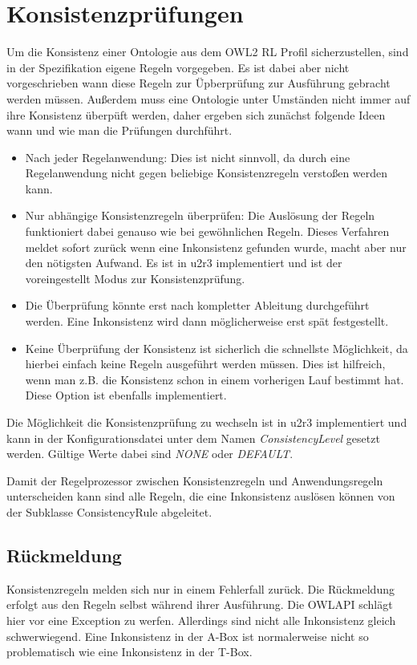 \section{Konsistenzprüfungen}
Um die Konsistenz einer Ontologie aus dem OWL2 RL Profil sicherzustellen, sind in der Spezifikation eigene Regeln vorgegeben. Es ist dabei aber nicht vorgeschrieben wann diese Regeln zur Üpberprüfung zur Ausführung gebracht werden müssen. Außerdem muss eine Ontologie unter Umständen nicht immer auf ihre Konsistenz überpüft werden, daher ergeben sich zunächst folgende Ideen wann und wie man die Prüfungen durchführt.

\begin{itemize}
  \item Nach jeder Regelanwendung: Dies ist nicht sinnvoll, da durch eine Regelanwendung nicht gegen beliebige Konsistenzregeln verstoßen werden kann.
  \item Nur abhängige Konsistenzregeln überprüfen: Die Auslösung der Regeln funktioniert dabei genauso wie bei gewöhnlichen Regeln. Dieses Verfahren meldet sofort zurück wenn eine Inkonsistenz gefunden wurde, macht aber nur den nötigsten Aufwand. Es ist in u2r3 implementiert und ist der voreingestellt Modus zur Konsistenzprüfung.
  \item Die Überprüfung könnte erst nach kompletter Ableitung durchgeführt werden. Eine Inkonsistenz wird dann möglicherweise erst spät festgestellt.
  \item Keine Überprüfung der Konsistenz ist sicherlich die schnellste Möglichkeit, da hierbei einfach keine Regeln ausgeführt werden müssen. Dies ist hilfreich, wenn man z.B. die Konsistenz schon in einem vorherigen Lauf bestimmt hat. Diese Option ist ebenfalls implementiert.
\end{itemize} 
Die Möglichkeit die Konsistenzprüfung zu wechseln ist in u2r3 implementiert und kann in der Konfigurationsdatei unter dem Namen \emph{ConsistencyLevel} gesetzt werden. Gültige Werte dabei sind \emph{NONE} oder \emph{DEFAULT}.

Damit der Regelprozessor zwischen Konsistenzregeln und Anwendungsregeln unterscheiden kann sind alle Regeln, die eine Inkonsistenz auslösen können von der Subklasse ConsistencyRule abgeleitet.

\subsection{Rückmeldung}
Konsistenzregeln melden sich nur in einem Fehlerfall zurück. Die Rückmeldung erfolgt aus den Regeln selbst während ihrer Ausführung. Die OWLAPI schlägt hier vor eine Exception zu werfen. Allerdings sind nicht alle Inkonsistenz gleich schwerwiegend. Eine Inkonsistenz in der A-Box ist normalerweise nicht so problematisch wie eine Inkonsistenz in der T-Box.

